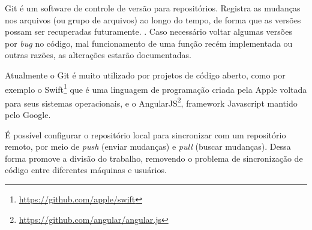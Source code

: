 Git é um software de controle de versão para repositórios. Registra as mudanças nos arquivos (ou grupo de arquivos) ao longo do tempo, de forma que as versões possam ser recuperadas futuramente. \cite{pro-git}. Caso necessário voltar algumas versões por \textit{bug} no código, mal funcionamento de uma função recém implementada ou outras razões, as alterações estarão documentadas.

Atualmente o Git é muito utilizado por projetos de código aberto, como por exemplo o Swift\footnote{\url{https://github.com/apple/swift}} que é uma linguagem de programação criada pela Apple voltada para seus sistemas operacionais, e o AngularJS\footnote{\url{https://github.com/angular/angular.js}}, framework Javascript mantido pelo Google.

É possível configurar o repositório local para sincronizar com um repositório remoto, por meio de \textit{push} (enviar mudanças) e \textit{pull} (buscar mudanças). Dessa forma promove a divisão do trabalho, removendo o problema de sincronização de código entre diferentes máquinas e usuários.



